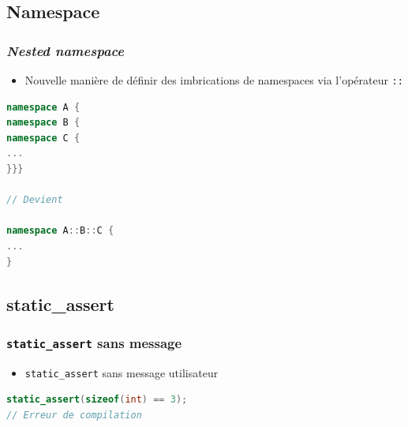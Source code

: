\documentclass[C++.tex]{subfiles}
\begin{document}
\subsection*{Namespace}
\begin{frame}[fragile]
	\frametitle{\textit{Nested namespace}}
	\begin{itemize}
		\item Nouvelle manière de définir des imbrications de namespaces via l'opérateur \lstinline|::| 
	\end{itemize}

	\begin{lstlisting}[language=C++]
namespace A {
namespace B {
namespace C {
...
}}}

// Devient

namespace A::B::C {
...
}\end{lstlisting}
\end{frame}

\subsection*{static\_assert}
\begin{frame}[fragile]
	\frametitle{\lstinline|static_assert| sans message}
	\begin{itemize}
		\item \lstinline|static_assert| sans message utilisateur
	\end{itemize}

	\begin{lstlisting}[language=C++]
static_assert(sizeof(int) == 3);
// Erreur de compilation\end{lstlisting}
\end{frame}
\end{document}
